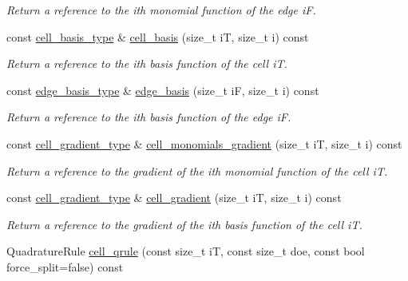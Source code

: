 \begin{DoxyCompactItemize}
\begin{DoxyCompactList}\small\item\em Return a reference to the i\textquotesingle{}th monomial function of the edge iF. \end{DoxyCompactList}\item 
const \hyperlink{classHArDCore2D_1_1HybridCore_a4b9c53f6ec13dc9e73f5cdc5c8ae782b}{cell\+\_\+basis\+\_\+type} \& \hyperlink{classHArDCore2D_1_1HybridCore_a34242db07cc2b3c3b867d9e4580b634d}{cell\+\_\+basis} (size\+\_\+t iT, size\+\_\+t i) const
\begin{DoxyCompactList}\small\item\em Return a reference to the i\textquotesingle{}th basis function of the cell iT. \end{DoxyCompactList}\item 
const \hyperlink{classHArDCore2D_1_1HybridCore_a9e3231c1356e797daaa3476ff1fa4154}{edge\+\_\+basis\+\_\+type} \& \hyperlink{classHArDCore2D_1_1HybridCore_a6b4feaeef7739a2e30fcf6c601fcf721}{edge\+\_\+basis} (size\+\_\+t iF, size\+\_\+t i) const
\begin{DoxyCompactList}\small\item\em Return a reference to the i\textquotesingle{}th basis function of the edge iF. \end{DoxyCompactList}\item 
const \hyperlink{classHArDCore2D_1_1HybridCore_a41350d7c3ac5a5a5e932348d2c9d0750}{cell\+\_\+gradient\+\_\+type} \& \hyperlink{classHArDCore2D_1_1HybridCore_a0edb2fb02577f68744abb8a436381cf7}{cell\+\_\+monomials\+\_\+gradient} (size\+\_\+t iT, size\+\_\+t i) const
\begin{DoxyCompactList}\small\item\em Return a reference to the gradient of the i\textquotesingle{}th monomial function of the cell iT. \end{DoxyCompactList}\item 
const \hyperlink{classHArDCore2D_1_1HybridCore_a41350d7c3ac5a5a5e932348d2c9d0750}{cell\+\_\+gradient\+\_\+type} \& \hyperlink{classHArDCore2D_1_1HybridCore_a710fc23b914623b90a2699ab4291e539}{cell\+\_\+gradient} (size\+\_\+t iT, size\+\_\+t i) const
\begin{DoxyCompactList}\small\item\em Return a reference to the gradient of the i\textquotesingle{}th basis function of the cell iT. \end{DoxyCompactList}\item 
Quadrature\+Rule \hyperlink{classHArDCore2D_1_1HybridCore_a5d70dcda8d8a56311b2d1eac4f7d306c}{cell\+\_\+qrule} (const size\+\_\+t iT, const size\+\_\+t doe, const bool force\+\_\+split=false) const

\end{DoxyCompactItemize}
